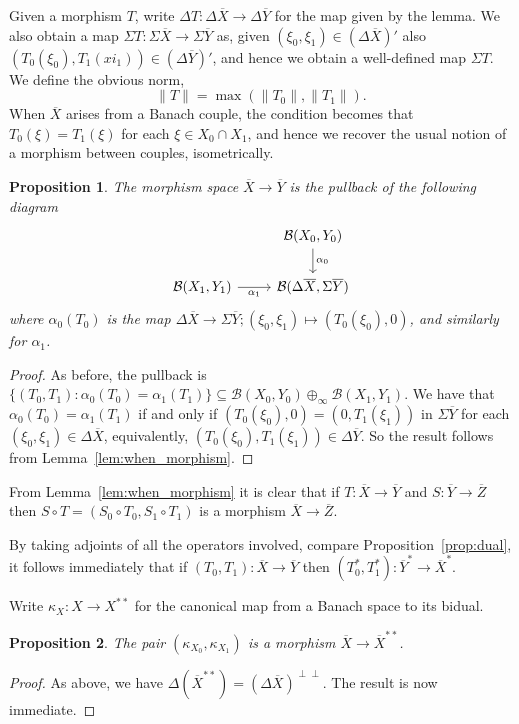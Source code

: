 \documentclass[a4paper,11pt]{article}
\theoremstyle{plain}
\newtheorem{proposition}{Proposition}[section]
\theoremstyle{remark}
\newcommand{\mc}[1]{\mathcal{#1}}
\begin{document}
Given a morphism $T$, write $\Delta T \colon \Delta\overline X \to \Delta\overline Y$ for the map given by the lemma.  We also obtain a map $\Sigma T \colon \Sigma\overline X \to \Sigma\overline Y$ as, given $(\xi_0,\xi_1) \in (\Delta\overline X)'$ also $(T_0(\xi_0), T_1(xi_1)) \in (\Delta\overline Y)'$, and hence we obtain a well-defined map $\Sigma T$.  We define the obvious norm,
\[ \|T\| = \max( \|T_0\|, \|T_1\| ). \]
When $\overline X$ arises from a Banach couple, the condition becomes that $T_0(\xi) = T_1(\xi)$ for each $\xi\in X_0 \cap X_1$, and hence we recover the usual notion of a morphism between couples, isometrically.

\begin{proposition}
The morphism space $\overline X \to\overline Y$ is the pullback of the following diagram
\[ \begin{tikzcd}
  & \mc B(X_0, Y_0) \arrow[d, "\alpha_0"] \\
  \mc B(X_1,Y_1) \arrow[r, "\alpha_1"']  & \mc B(\Delta\overline X, \Sigma\overline Y)
\end{tikzcd} \]
where $\alpha_0(T_0)$ is the map $\Delta\overline X \to \Sigma\overline Y; (\xi_0,\xi_1) \mapsto (T_0(\xi_0), 0)$, and similarly for $\alpha_1$.
\end{proposition}
\begin{proof}
As before, the pullback is $\{ (T_0,T_1) : \alpha_0(T_0) = \alpha_1(T_1) \} \subseteq \mc B(X_0,Y_0) \oplus_\infty \mc B(X_1,Y_1)$.  We have that $\alpha_0(T_0) = \alpha_1(T_1)$ if and only if $(T_0(\xi_0),0) = (0,T_1(\xi_1))$ in $\Sigma\overline Y$ for each $(\xi_0,\xi_1)\in\Delta\overline X$, equivalently, $(T_0(\xi_0), T_1(\xi_1))\in\Delta\overline Y$.  So the result follows from Lemma~\ref{lem:when_morphism}.
\end{proof}

From Lemma~\ref{lem:when_morphism} it is clear that if $T\colon \overline X \to \overline Y$ and $S\colon \overline Y\to\overline Z$ then $S\circ T = (S_0\circ T_0, S_1\circ T_1)$ is a morphism $\overline X \to \overline Z$.

By taking adjoints of all the operators involved, compare Proposition~\ref{prop:dual}, it follows immediately that if $(T_0, T_1) \colon \overline X\to\overline Y$ then $(T_0^*, T_1^*) \colon \overline Y^* \to \overline X^*$.

Write $\kappa_X \colon X \to X^{**}$ for the canonical map from a Banach space to its bidual.

\begin{proposition}
The pair $(\kappa_{X_0}, \kappa_{X_1})$ is a morphism $\overline X \to \overline X^{**}$.
\end{proposition}
\begin{proof}
As above, we have $\Delta(\overline X^{**}) = (\Delta\overline X)^{\perp\perp}$.  The result is now immediate.
\end{proof}
\end{document}
